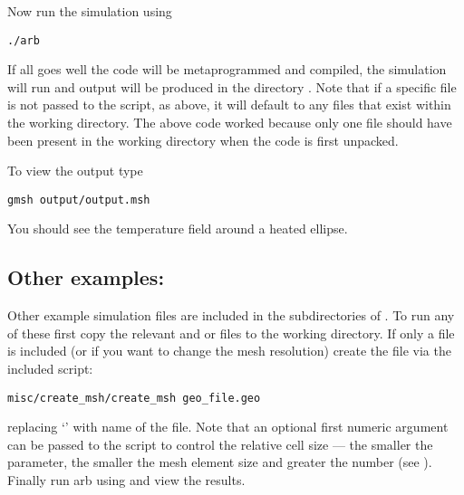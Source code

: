 Now run the simulation using
%
\begin{verbatim}
./arb
\end{verbatim}
%
If all goes well the code will be metaprogrammed and compiled, the simulation will run and output will be produced in the directory .  Note that if a specific  file is not passed to the  script, as above, it will default to any  files that exist within the working directory.  The above code worked because only one  file should have been present in the working directory when the code is first unpacked.

To view the output type 
%
\begin{verbatim}
gmsh output/output.msh
\end{verbatim}
%
You should see the temperature field around a heated ellipse.

\subsection{Other examples:}

Other example simulation files are included in the subdirectories of .  To run any of these first copy the relevant  and  or  files to the working directory.  If only a  file is included (or if you want to change the mesh resolution) create the  file via the included  script:
%
\begin{verbatim}
misc/create_msh/create_msh geo_file.geo
\end{verbatim}
%
replacing `' with name of the file.  Note that an optional first numeric argument can be passed to the script to control the relative cell size --- the smaller the parameter, the smaller the mesh element size and greater the number (see ).  Finally run arb using  and view the results.  


